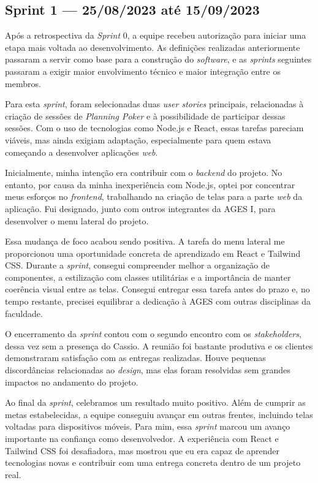 \clearpage
\subsection{Sprint 1 --- 25/08/2023 até 15/09/2023}

Após a retrospectiva da \textit{Sprint} 0, a equipe recebeu autorização para iniciar uma etapa mais voltada ao desenvolvimento. As definições realizadas anteriormente passaram a servir como base para a construção do \textit{software}, e as \textit{sprints} seguintes passaram a exigir maior envolvimento técnico e maior integração entre os membros.

Para esta \textit{sprint}, foram selecionadas duas \textit{user stories} principais, relacionadas à criação de sessões de \textit{Planning Poker} e à possibilidade de participar dessas sessões. Com o uso de tecnologias como Node.js e React, essas tarefas pareciam viáveis, mas ainda exigiam adaptação, especialmente para quem estava começando a desenvolver aplicações \textit{web}.

Inicialmente, minha intenção era contribuir com o \textit{backend} do projeto. No entanto, por causa da minha inexperiência com Node.js, optei por concentrar meus esforços no \textit{frontend}, trabalhando na criação de telas para a parte \textit{web} da aplicação. Fui designado, junto com outros integrantes da \ac{AGES} I, para desenvolver o menu lateral do projeto.

Essa mudança de foco acabou sendo positiva. A tarefa do menu lateral me proporcionou uma oportunidade concreta de aprendizado em React e Tailwind \ac{CSS}. Durante a \textit{sprint}, consegui compreender melhor a organização de componentes, a estilização com classes utilitárias e a importância de manter coerência visual entre as telas. Consegui entregar essa tarefa antes do prazo e, no tempo restante, precisei equilibrar a dedicação à \ac{AGES} com outras disciplinas da faculdade.

O encerramento da \textit{sprint} contou com o segundo encontro com os \textit{stakeholders}, dessa vez sem a presença do Cassio. A reunião foi bastante produtiva e os clientes demonstraram satisfação com as entregas realizadas. Houve pequenas discordâncias relacionadas ao \textit{design}, mas elas foram resolvidas sem grandes impactos no andamento do projeto.

Ao final da \textit{sprint}, celebramos um resultado muito positivo. Além de cumprir as metas estabelecidas, a equipe conseguiu avançar em outras frentes, incluindo telas voltadas para dispositivos móveis. Para mim, essa \textit{sprint} marcou um avanço importante na confiança como desenvolvedor. A experiência com React e Tailwind \ac{CSS} foi desafiadora, mas mostrou que eu era capaz de aprender tecnologias novas e contribuir com uma entrega concreta dentro de um projeto real.
